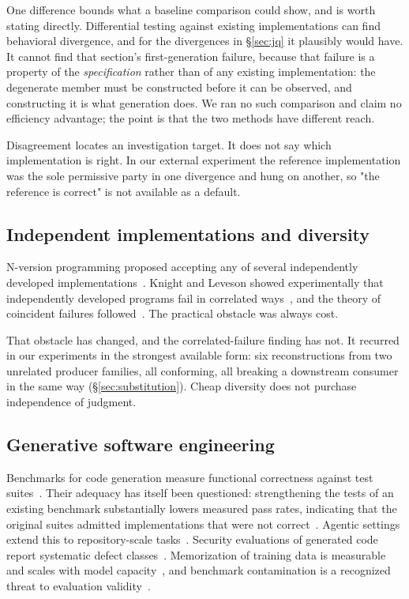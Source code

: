 \documentclass[10pt,twocolumn]{article}
\begin{document}
One difference bounds what a baseline comparison could show, and is
worth stating directly. Differential testing against existing
implementations can find behavioral divergence, and for the divergences
in \S\ref{sec:jq} it plausibly would have. It cannot find that section's
first-generation failure, because that failure is a property of the
\emph{specification} rather than of any existing implementation: the
degenerate member must be constructed before it can be observed, and
constructing it is what generation does. We ran no such comparison and
claim no efficiency advantage; the point is that the two methods have
different reach.

Disagreement locates an investigation target. It does not say which
implementation is right. In our external experiment the reference
implementation was the sole permissive party in one divergence and hung
on another, so "the reference is correct" is not available as a default.

\subsection{Independent implementations and diversity}

N-version programming proposed accepting any of several independently
developed implementations~\cite{avizienis1985}. Knight and Leveson
showed experimentally that independently developed programs fail in
correlated ways~\cite{knight1986}, and the theory of coincident
failures followed~\cite{eckhardt1985,littlewood1989}. The practical
obstacle was always cost.

That obstacle has changed, and the correlated-failure finding has not. It
recurred in our experiments in the strongest available form: six
reconstructions from two unrelated producer families, all conforming, all
breaking a downstream consumer in the same way (\S\ref{sec:substitution}).
Cheap diversity does not purchase independence of judgment.

\subsection{Generative software engineering}
\label{sec:gen}

Benchmarks for code generation measure functional correctness against
test suites~\cite{chen2021,austin2021,hendrycks2021}. Their adequacy has
itself been questioned: strengthening the tests of an existing benchmark
substantially lowers measured pass rates, indicating that the original
suites admitted implementations that were not
correct~\cite{liu2023}. Agentic settings extend this to repository-scale
tasks~\cite{jimenez2024}. Security evaluations of generated code report
systematic defect classes~\cite{pearce2022}. Memorization of training
data is measurable and scales with model
capacity~\cite{carlini2023}, and benchmark contamination is a recognized
threat to evaluation validity~\cite{sainz2023}.
\end{document}
